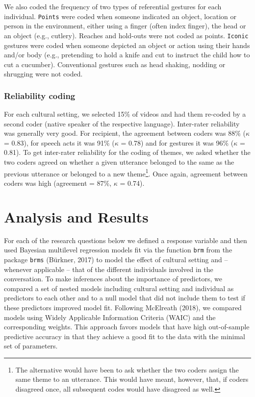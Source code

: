 \documentclass[
  man,floatsintext]{apa6}
\begin{document}
We also coded the frequency of two types of referential gestures for each individual. \texttt{Points} were coded when someone indicated an object, location or person in the environment, either using a finger (often index finger), the head or an object (e.g., cutlery). Reaches and hold-outs were not coded as points. \texttt{Iconic} gestures were coded when someone depicted an object or action using their hands and/or body (e.g., pretending to hold a knife and cut to instruct the child how to cut a cucumber). Conventional gestures such as head shaking, nodding or shrugging were not coded.

\hypertarget{reliability-coding}{%
\subsubsection{Reliability coding}\label{reliability-coding}}

For each cultural setting, we selected 15\% of videos and had them re-coded by a second coder (native speaker of the respective language). Inter-rater reliability was generally very good. For recipient, the agreement between coders was 88\% (\(\kappa\) = 0.83), for speech acts it was 91\% (\(\kappa\) = 0.78) and for gestures it was 96\% (\(\kappa\) = 0.81). To get inter-rater reliability for the coding of themes, we asked whether the two coders agreed on whether a given utterance belonged to the same as the previous utterance or belonged to a new theme\footnote{The alternative would have been to ask whether the two coders assign the same theme to an utterance. This would have meant, however, that, if coders disagreed once, all subsequent codes would have disagreed as well.}. Once again, agreement between coders was high (agreement = 87\%, \(\kappa\) = 0.74).

\hypertarget{analysis-and-results}{%
\section{Analysis and Results}\label{analysis-and-results}}

For each of the research questions below we defined a response variable and then used Bayesian multilevel regression models fit via the function \texttt{brm} from the package \texttt{brms} (Bürkner, 2017) to model the effect of cultural setting and -- whenever applicable -- that of the different individuals involved in the conversation. To make inferences about the importance of predictors, we compared a set of nested models including cultural setting and individual as predictors to each other and to a null model that did not include them to test if these predictors improved model fit. Following McElreath (2018), we compared models using Widely Applicable Information Criteria (WAIC) and the corresponding weights. This approach favors models that have high out-of-sample predictive accuracy in that they achieve a good fit to the data with the minimal set of parameters.
\end{document}
